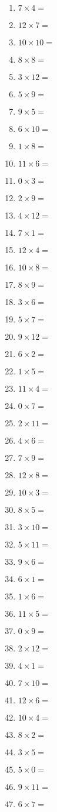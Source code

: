 \documentclass{article}
\begin{document}
\begin{multicols}{4}
\begin{enumerate}[label=\arabic*.,itemsep=0pt,parsep=0pt]
\item $7 \times 4 =$
\item $12 \times 7 =$
\item $10 \times 10 =$
\item $8 \times 8 =$
\item $3 \times 12 =$
\item $5 \times 9 =$
\item $9 \times 5 =$
\item $6 \times 10 =$
\item $1 \times 8 =$
\item $11 \times 6 =$
\item $0 \times 3 =$
\item $2 \times 9 =$
\item $4 \times 12 =$
\item $7 \times 1 =$
\item $12 \times 4 =$
\item $10 \times 8 =$
\item $8 \times 9 =$
\item $3 \times 6 =$
\item $5 \times 7 =$
\item $9 \times 12 =$
\item $6 \times 2 =$
\item $1 \times 5 =$
\item $11 \times 4 =$
\item $0 \times 7 =$
\item $2 \times 11 =$
\item $4 \times 6 =$
\item $7 \times 9 =$
\item $12 \times 8 =$
\item $10 \times 3 =$
\item $8 \times 5 =$
\item $3 \times 10 =$
\item $5 \times 11 =$
\item $9 \times 6 =$
\item $6 \times 1 =$
\item $1 \times 6 =$
\item $11 \times 5 =$
\item $0 \times 9 =$
\item $2 \times 12 =$
\item $4 \times 1 =$
\item $7 \times 10 =$
\item $12 \times 6 =$
\item $10 \times 4 =$
\item $8 \times 2 =$
\item $3 \times 5 =$
\item $5 \times 0 =$
\item $9 \times 11 =$
\item $6 \times 7 =$
\end{enumerate}
\end{multicols}
\end{document}
